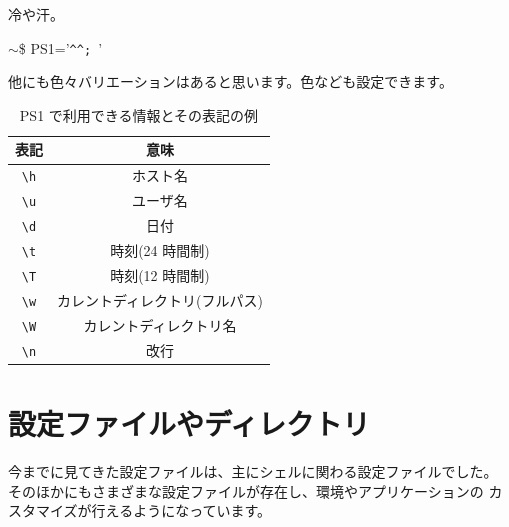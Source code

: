 \documentclass[a4j]{ltjreport}
\begin{document}
    冷や汗。
    \begin{screen}
        $\sim$\$ PS1='\verb+^^; +'
    \end{screen}
    他にも色々バリエーションはあると思います。色なども設定できます。
    \begin{table}[htbp]
        \centering
        \caption{PS1 で利用できる情報とその表記の例}
        \label{tab:ps1}
        \begin{tabular}{cc} \hline\hline
            表記 & 意味 \\ \hline
            \verb+\h+    &  ホスト名  \\
            \verb+\u+    &  ユーザ名  \\
            \verb+\d+    &  日付  \\
            \verb+\t+    &  時刻(24 時間制)  \\
            \verb+\T+    &  時刻(12 時間制)  \\
            \verb+\w+    &  カレントディレクトリ(フルパス)  \\
            \verb+\W+    &  カレントディレクトリ名  \\
            \verb+\n+    &  改行  \\
            \hline\hline
        \end{tabular}
    \end{table}

    \section{設定ファイルやディレクトリ}
    今までに見てきた設定ファイルは、主にシェルに関わる設定ファイルでした。
    そのほかにもさまざまな設定ファイルが存在し、環境やアプリケーションの
    カスタマイズが行えるようになっています。
\end{document}
